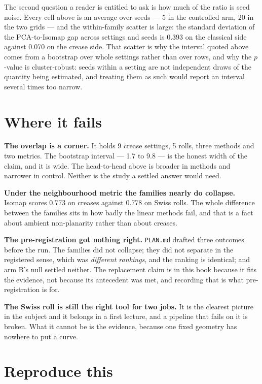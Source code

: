 \documentclass[
  british,
  a4paper,
]{book}
\begin{document}
The second question a reader is entitled to ask is how much of the ratio is seed
noise. Every cell above is an average over seeds --- 5 in
the controlled arm, 20 in the two grids --- and the
within-family scatter is large: the standard deviation of the PCA-to-Isomap gap
across settings and seeds is 0.393
on the classical side against
0.070 on the crease side.
That scatter is why the interval quoted above comes from a bootstrap over whole
settings rather than over rows, and why the \(p\)-value is cluster-robust: seeds
within a setting are not independent draws of the quantity being estimated, and
treating them as such would report an interval several times too narrow.

\section{Where it fails}\label{comp-limits}

\textbf{The overlap is a corner.} It holds
9 crease settings,
5 rolls, three methods and two
metrics. The bootstrap interval ---
1.7 to 9.8 --- is the honest
width of the claim, and it is wide. The head-to-head above is broader in methods
and narrower in control. Neither is the study a settled answer would need.

\textbf{Under the neighbourhood metric the families nearly do collapse.} Isomap scores
0.773 on creases against
0.778 on Swiss rolls. The whole
difference between the families sits in how badly the linear methods fail, and
that is a fact about ambient non-planarity rather than about creases.

\textbf{The pre-registration got nothing right.} \texttt{PLAN.md} drafted three outcomes
before the run. The families did not collapse; they did not separate in the
registered sense, which was \emph{different rankings}, and the ranking is identical;
and arm B's null settled neither. The replacement claim is in this book because
it fits the evidence, not because its antecedent was met, and recording that is
what pre-registration is for.

\textbf{The Swiss roll is still the right tool for two jobs.} It is the clearest
picture in the subject and it belongs in a first lecture, and a pipeline that
fails on it is broken. What it cannot be is the evidence, because one fixed
geometry has nowhere to put a curve.

\section{Reproduce this}\label{comp-reproduce}
\end{document}
